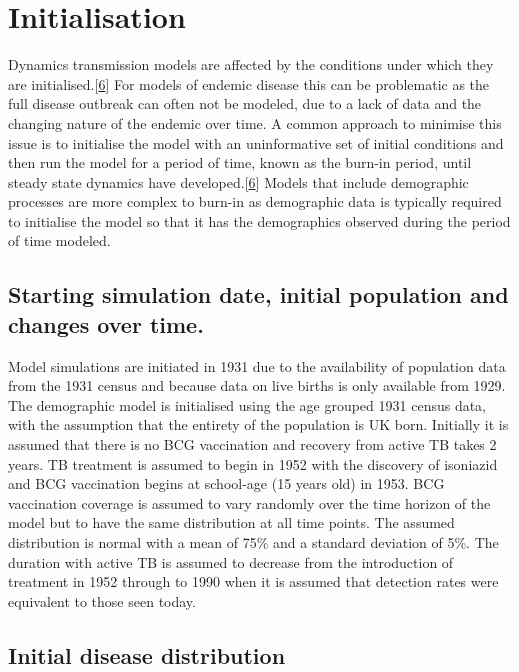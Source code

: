 \documentclass[11pt,twoside]{bristolthesis}
\begin{document}
  \hypertarget{initialisation}{%
  \section{Initialisation}\label{initialisation}}
  
  Dynamics transmission models are affected by the conditions under which they are initialised.{[}\protect\hyperlink{ref-Anderson1991}{6}{]} For models of endemic disease this can be problematic as the full disease outbreak can often not be modeled, due to a lack of data and the changing nature of the endemic over time. A common approach to minimise this issue is to initialise the model with an uninformative set of initial conditions and then run the model for a period of time, known as the burn-in period, until steady state dynamics have developed.{[}\protect\hyperlink{ref-Anderson1991}{6}{]} Models that include demographic processes are more complex to burn-in as demographic data is typically required to initialise the model so that it has the demographics observed during the period of time modeled.
  
  \hypertarget{starting-simulation-date-initial-population-and-changes-over-time.}{%
  \subsection{Starting simulation date, initial population and changes over time.}\label{starting-simulation-date-initial-population-and-changes-over-time.}}
  
  Model simulations are initiated in 1931 due to the availability of population data from the 1931 census and because data on live births is only available from 1929. The demographic model is initialised using the age grouped 1931 census data, with the assumption that the entirety of the population is UK born. Initially it is assumed that there is no BCG vaccination and recovery from active TB takes 2 years. TB treatment is assumed to begin in 1952 with the discovery of isoniazid and BCG vaccination begins at school-age (15 years old) in 1953. BCG vaccination coverage is assumed to vary randomly over the time horizon of the model but to have the same distribution at all time points. The assumed distribution is normal with a mean of 75\% and a standard deviation of 5\%. The duration with active TB is assumed to decrease from the introduction of treatment in 1952 through to 1990 when it is assumed that detection rates were equivalent to those seen today.
  
  \hypertarget{initial-disease-distribution}{%
  \subsection{Initial disease distribution}\label{initial-disease-distribution}}
  
\end{document}
